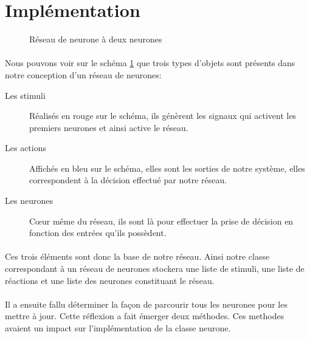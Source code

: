 \section{Implémentation}

\begin{figure}[ht]
  \centering
  
  \caption{Réseau de neurone à deux neurones}
  \label{graphInit}
\end{figure}

\paragraph{}
Nous pouvons voir sur le schéma \ref{graphInit} que trois types d'objets sont
présents dans notre conception d'un réseau de neurones:\\
\begin{description}
  \item[Les stimuli] Réalisés en rouge sur le schéma, ils génèrent les signaux
    qui activent les premiers neurones et ainsi active le réseau.
  \item[Les actions] Affichés en bleu sur le schéma, elles sont les sorties de
    notre système, elles correspondent à la décision effectué par notre réseau.
  \item[Les neurones] Cœur même du réseau, ils sont là pour effectuer la prise
    de décision en fonction des entrées qu'ils possèdent.
\end{description}

\paragraph{}
Ces trois éléments sont donc la base de notre réseau. Ainsi notre classe correspondant
à un réseau de neurones stockera une liste de stimuli, une liste de réactions et une
liste des neurones constituant le réseau.

\paragraph{}
Il a ensuite fallu déterminer la façon de parcourir tous les neurones pour les
mettre à jour. Cette réflexion a fait émerger deux méthodes. Ces methodes
avaient un impact sur l'implémentation de la classe neurone.\\

